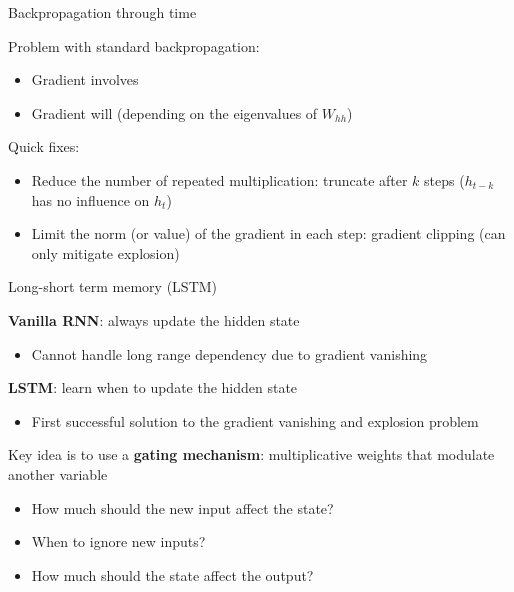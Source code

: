 \documentclass[usenames,dvipsnames,notes,11pt,aspectratio=169,hyperref={colorlinks=true, linkcolor=blue}]{beamer}
\begin{document}
\begin{frame}
    {Backpropagation through time}
    
    Problem with standard backpropagation:\\
    \begin{itemize}
        \item Gradient involves 
        \item Gradient will  (depending on the eigenvalues of $W_{hh}$)
    \end{itemize}

    \pause
    Quick fixes:\\
    \begin{itemize}
        \item Reduce the number of repeated multiplication: truncate after $k$ steps ($h_{t-k}$ has no influence on $h_t$)
        \item Limit the norm (or value) of the gradient in each step: gradient clipping (can only mitigate explosion)
    \end{itemize}
\end{frame}

\begin{frame}
    {Long-short term memory (LSTM)}

    \textbf{Vanilla RNN}: always update the hidden state\\
    \begin{itemize}
        \item Cannot handle long range dependency due to gradient vanishing 
    \end{itemize}
    \pause

    \textbf{LSTM}: learn when to update the hidden state\\
    \begin{itemize}
        \item First successful solution to the gradient vanishing and explosion problem 
    \end{itemize}
    \pause

    Key idea is to use a \textbf{gating mechanism}: multiplicative weights that modulate another variable \\
    \begin{itemize}
        \item How much should the new input affect the state?
        \item When to ignore new inputs?
        \item How much should the state affect the output? 
    \end{itemize}
\end{frame}
\end{document}
